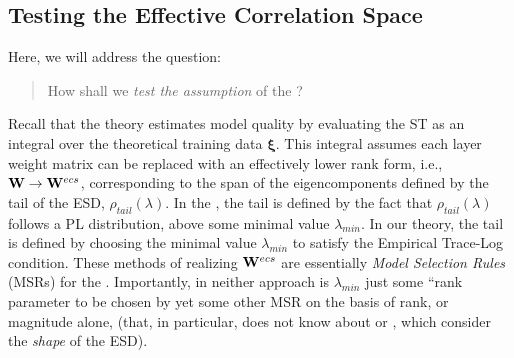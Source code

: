 
\subsection{Testing the Effective Correlation Space}
\label{sxn:empirical-effective_corr_space}

Here, we will address the question: 
\begin{quote}
How shall we \emph{test the assumption} of the \EffectiveCorrelationSpace?
\end{quote}
Recall that the \SETOL theory estimates model quality by evaluating the ST \GeneralizationError as an integral over the theoretical training data $\boldsymbol{\xi}$.
This integral assumes each layer weight matrix can be replaced with an effectively lower rank form, i.e., $\mathbf{W}\rightarrow\mathbf{W}^{ecs}$, corresponding to the span of the eigencomponents defined by the tail of the ESD, $\rho_{tail}(\lambda)$. 
In the \HTSR \Phenomenology, the tail is defined by the fact that $\rho_{tail}(\lambda)$ follows a PL distribution, above some minimal value $\lambda_{min}$.
In our \SETOL theory, the tail is defined by choosing the minimal value $\lambda_{min}$ to satisfy the Empirical Trace-Log condition.
%
These methods of realizing $\mathbf{W}^{ecs}$ are essentially \emph{Model Selection Rules} (MSRs) for the \EffectiveCorrelationSpace. 
%
Importantly, in neither approach is $\lambda_{min}$ just some ``rank parameter to be chosen by yet some other MSR on 
the basis of rank, or magnitude alone, (that, in particular, does not know about \HTSR or \SETOL, which consider the 
\emph{shape} of the ESD).

